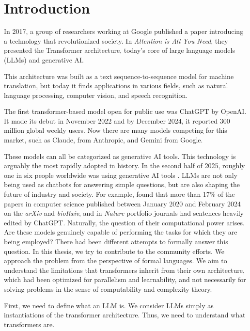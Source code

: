 \chapter{Introduction}

In 2017, a group of researchers working at Google published a paper introducing a technology that revolutionized society.
In \textit{Attention is All You Need}, they presented the Transformer architecture, today's core of large language models (LLMs) and generative AI.

This architecture was built as a text sequence-to-sequence model for machine translation, but today it finds applications in various fields, such as natural language processing, computer vision, and speech recognition.

The first transformer-based model open for public use was ChatGPT by OpenAI.
It made its debut in November 2022 and by December 2024, it reported 300 million global weekly users.
Now there are many models competing for this market, such as Claude, from Anthropic, and Gemini from Google.

These models can all be categorized as generative AI tools.
This technology is arguably the most rapidly adopted in history.
In the second half of 2025, roughly one in six people worldwide was using generative AI tools \citep{microsoft2026aidiffusion}.
LLMs are not only being used as chatbots for answering simple questions, but are also shaping the future of industry and society.
For example, \citet{liang2024mappingincreasingusellms} found that more than 17\% of the papers in computer science published between January 2020 and February 2024 on the \textit{arXiv} and \textit{bioRxiv}, and in \textit{Nature} portfolio journals had sentences heavily edited by ChatGPT. 
Naturally, the question of their computational power arises.
Are these models genuinely capable of performing the tasks for which they are being employed?
There had been different attempts to formally answer this question.
In this thesis, we try to contribute to the community efforts.
We approach the problem from the perspective of formal languages.
We aim to understand the limitations that transformers inherit from their own architecture, which had been optimized for parallelism and learnability, and not necessarily for solving problems in the sense of computability and complexity theory.


\bigskip

First, we need to define what an LLM is.
We consider LLMs simply as instantiations of the transformer architecture.
Thus, we need to understand what transformers are.

